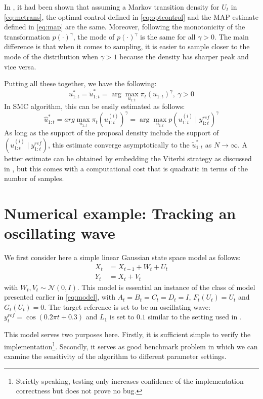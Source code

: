 In \cite{NK11}, it had been shown that assuming a Markov transition density for $U_t$ in \eqref{eq:mctrans}, the optimal control defined in \eqref{eq:optcontrol} and the MAP estimate defined in \eqref{eq:map} are the same. Moreover, following the monotonicity of the transformation $p(\cdot)^\gamma$, the mode of $p(\cdot)^\gamma$ is the same for all $\gamma > 0$. The main difference is that when it comes to sampling, it is easier to sample closer to the mode of the distribution when $\gamma > 1$ because the density has sharper peak and vice versa.

Putting all these together, we have the following:
\begin{equation}
  u^*_{1:t} = \tilde{u}^*_{1:t} = \arg\max_{u_{1:t}} \pi_t(u_{1:t})^\gamma,~\gamma > 0
\end{equation}
In SMC algorithm, this can be easily estimated as follows:
\begin{equation}
\hat{u}^*_{1:t} = arg\max_{u_{1:t}} \pi_t(u^{(i)}_{1:t})^\gamma = \arg\max_{u_{1:t}} p(u^{(i)}_{1:t} \mid y^{ref}_{1:t})^\gamma
\end{equation}
As long as the support of the proposal density include the support of $(u^{(i)}_{1:t} \mid y^{ref}_{1:t})$, this estimate converge asymptotically to the $\tilde{u}^*_{1:t}$ as $N \to \infty$. A better estimate can be obtained by embedding the Viterbi strategy as discussed in \cite{SG01}, but this comes with a computational cost that is quadratic in terms of the number of samples.

\section{Numerical example: Tracking an oscillating wave}
\label{sec:exp1}
We first consider here a simple linear Gaussian state space model as follows:
\begin{align}
  X_t &= X_{t-1} + W_t + U_t \nonumber \\
  Y_t &= X_t + V_t
\label{eq:refnmodel}
\end{align}
with $W_t, V_t \sim \mathcal{N}(0,I)$. This model is essential an instance of the class of model presented earlier in \eqref{eq:model}, with $A_t=B_t=C_t=D_t=I$, $F_t(U_t)=U_t$ and $G_t(U_t)=0$. The target reference is set to be an oscillating wave: $y^{ref}_t = \cos(0.2 \pi t + 0.3)$ and $L_1$ is set to $0.1$ similar to the setting used in \cite{NK11}.

This model serves two purposes here. Firstly, it is sufficient simple to verify the implementation\footnote{Strictly speaking, testing only increases confidence of the implementation correctness but does not prove no bug.}. Secondly, it serves as good benchmark problem in which we can examine the sensitivity of the algorithm to different parameter settings.

